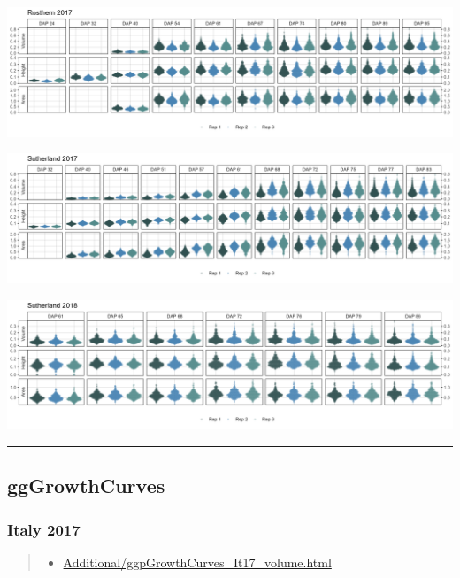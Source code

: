 \documentclass[
]{article}
\providecommand{\tightlist}{%
  \setlength{\itemsep}{0pt}\setlength{\parskip}{0pt}}
\begin{document}
\includegraphics{Additional/ggDroneTrait_Ro17.png}

\includegraphics{Additional/ggDroneTrait_Su17.png}

\includegraphics{Additional/ggDroneTrait_Su18.png}

\begin{center}\rule{0.5\linewidth}{0.5pt}\end{center}

\subsection{ggGrowthCurves}\label{gggrowthcurves}

\subsubsection{Italy 2017}\label{italy-2017}

\begin{quote}
\begin{itemize}
\tightlist
\item
  \href{https://derekmichaelwright.github.io/AGILE_LDP_UAV/Additional/ggpGrowthCurves_It17_volume.html}{Additional/ggpGrowthCurves\_It17\_volume.html}
\end{itemize}
\end{quote}
\end{document}
